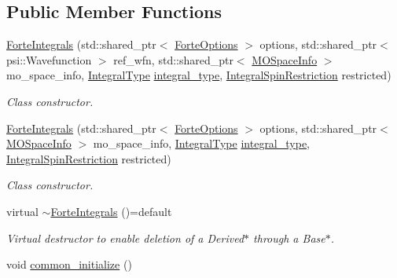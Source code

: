 \subsection*{Public Member Functions}
\begin{DoxyCompactItemize}
\item 
\mbox{\hyperlink{classforte_1_1_forte_integrals_ae1b1c7c744c7bd522c94bfa46d78bd05}{Forte\+Integrals}} (std\+::shared\+\_\+ptr$<$ \mbox{\hyperlink{classforte_1_1_forte_options}{Forte\+Options}} $>$ options, std\+::shared\+\_\+ptr$<$ psi\+::\+Wavefunction $>$ ref\+\_\+wfn, std\+::shared\+\_\+ptr$<$ \mbox{\hyperlink{classforte_1_1_m_o_space_info}{M\+O\+Space\+Info}} $>$ mo\+\_\+space\+\_\+info, \mbox{\hyperlink{namespaceforte_a790e7e85ac0911c4c9494622496d95e6}{Integral\+Type}} \mbox{\hyperlink{classforte_1_1_forte_integrals_af62c129aee5c995d15a95136a89faada}{integral\+\_\+type}}, \mbox{\hyperlink{namespaceforte_a7defa2660dd3eb07aa81176b90781be7}{Integral\+Spin\+Restriction}} restricted)
\begin{DoxyCompactList}\small\item\em Class constructor. \end{DoxyCompactList}\item 
\mbox{\hyperlink{classforte_1_1_forte_integrals_a3053bf9ad483639d24392da21fbf522b}{Forte\+Integrals}} (std\+::shared\+\_\+ptr$<$ \mbox{\hyperlink{classforte_1_1_forte_options}{Forte\+Options}} $>$ options, std\+::shared\+\_\+ptr$<$ \mbox{\hyperlink{classforte_1_1_m_o_space_info}{M\+O\+Space\+Info}} $>$ mo\+\_\+space\+\_\+info, \mbox{\hyperlink{namespaceforte_a790e7e85ac0911c4c9494622496d95e6}{Integral\+Type}} \mbox{\hyperlink{classforte_1_1_forte_integrals_af62c129aee5c995d15a95136a89faada}{integral\+\_\+type}}, \mbox{\hyperlink{namespaceforte_a7defa2660dd3eb07aa81176b90781be7}{Integral\+Spin\+Restriction}} restricted)
\begin{DoxyCompactList}\small\item\em Class constructor. \end{DoxyCompactList}\item 
virtual \mbox{\hyperlink{classforte_1_1_forte_integrals_a2d950c2561843509cf9cc5eb2205b0c6}{$\sim$\+Forte\+Integrals}} ()=default
\begin{DoxyCompactList}\small\item\em Virtual destructor to enable deletion of a Derived$\ast$ through a Base$\ast$. \end{DoxyCompactList}\item 
void \mbox{\hyperlink{classforte_1_1_forte_integrals_a74f97a711600c888b3cfea4e59c3483f}{common\+\_\+initialize}} ()

\end{DoxyCompactItemize}
